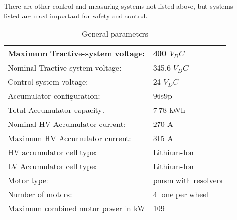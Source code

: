 There are other control and measuring systems not listed above, but systems listed are most important for safety and control.


\begin{table}[H]
	\centering
	\caption{General parameters}
	\begin{tabularx}{\textwidth}{|X|X|}
		\hline
		Maximum Tractive-system voltage: & 400 $V_DC$  \\[\TableSize]
		\hline Nominal Tractive-system voltage: & 345.6 $V_DC$\\[\TableSize]
		\hline
		Control-system voltage: & 24 $V_DC$ \\[\TableSize]
		\hline
		Accumulator configuration: & 96s9p \\[\TableSize]
		\hline
		Total Accumulator capacity: & 7.78 kWh\\[\TableSize]
		\hline
		Nominal HV Accumulator current: & 270 A \\[\TableSize]
		\hline
		Maximum HV Accumulator current: & 315 A \\[\TableSize]
		\hline
		HV accumulator cell type: & Lithium-Ion  \\[\TableSize]
		\hline
		LV Accumulator cell type: & Lithium-Ion \\[\TableSize]
		\hline
		Motor type: & \gls{pmsm} with resolvers \\[\TableSize]
		\hline
		Number of motors: &  4, one per wheel \\[\TableSize]
		\hline
		Maximum combined motor power in kW & 109 \\[\TableSize]
		\hline
	\end{tabularx}%
	\label{tab:system-general}%
\end{table}%
